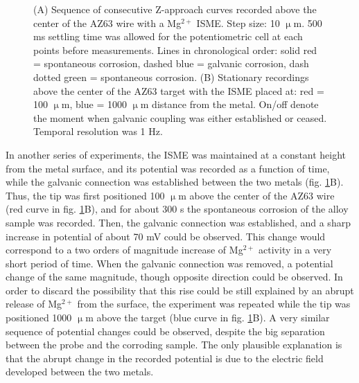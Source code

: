 \documentclass[3p]{elsarticle}
\begin{document}
\begin{figure}
\caption{(A) Sequence of consecutive Z-approach curves recorded above the center of the AZ63 wire with a Mg$^{2+}$ ISME. Step size: 10 $\upmu$m. 500 ms settling time was allowed for the potentiometric cell at each points before measurements. Lines in chronological order: solid red = spontaneous corrosion, dashed blue = galvanic corrosion, dash dotted green = spontaneous corrosion. (B) Stationary recordings above the center of the AZ63 target with the ISME placed at: red = 100 $\upmu$m, blue = 1000 $\upmu$m distance from the metal. On/off denote the moment when galvanic coupling was either established or ceased. Temporal resolution was 1 Hz.}
\label{fig:approach}
\end{figure}

In another series of experiments, the ISME was maintained at a constant height from the metal surface, and its potential was recorded as a function of time, while the galvanic connection was established between the two metals (fig. \ref{fig:approach}B). Thus, the tip was first positioned 100 $\upmu$m above the center of the AZ63 wire (red curve in fig. \ref{fig:approach}B), and for about 300 s the spontaneous corrosion of the alloy sample was recorded. Then, the galvanic connection was established, and a sharp increase in potential of about 70 mV could be observed. This change would correspond to a two orders of magnitude increase of Mg$^{2+}$ activity in a very short period of time. When the galvanic connection was removed, a potential change of the same magnitude, though opposite direction could be observed. In order to discard the possibility that this rise could be still explained by an abrupt release of Mg$^{2+}$ from the surface, the experiment was repeated while the tip was positioned 1000 $\upmu$m above the target (blue curve in fig. \ref{fig:approach}B). A very similar sequence of potential changes could be observed, despite the big separation between the probe and the corroding sample. The only plausible explanation is that the abrupt change in the recorded potential is due to the electric field developed between the two metals. 
\end{document}
